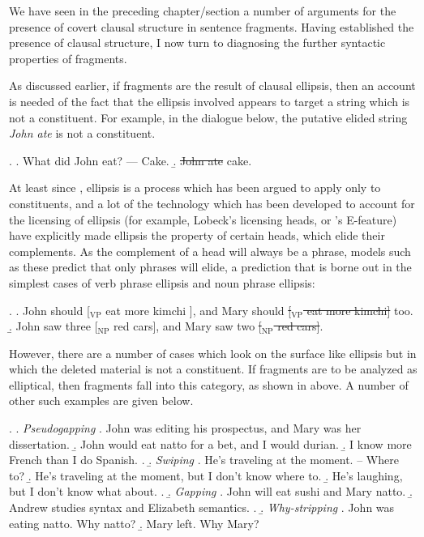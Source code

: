\documentclass[11pt,letterpaper]{article}
\begin{document}
\renewcommand{\firstrefdash}{}

We have seen in the preceding chapter/section %
a number of arguments for the presence of covert clausal structure in sentence fragments. Having established the presence of clausal structure, I now turn to diagnosing the further syntactic properties of fragments.

As discussed earlier, if fragments are the result of clausal ellipsis, then an account is needed of the fact that the ellipsis involved appears to target a string which is not a constituent. For example, in the dialogue below, the putative elided string {\it John ate} is not a constituent.

\ex. 	\a. What did John eat? --- Cake.
	\b. \sout{John ate} cake.
	
At least since \cite{Lo95}, ellipsis is a process which has been argued to apply only to constituents, and a lot of the technology which has been developed to account for the licensing of ellipsis (for example, Lobeck's licensing heads, or \cite{Me01, Me04}'s E-feature) have explicitly made ellipsis the property of certain heads, which elide their complements. As the complement of a head will always be a phrase, models such as these predict that only phrases will elide, a prediction that is borne out in the simplest cases of verb phrase ellipsis and noun phrase ellipsis:

\ex. 	\a. John should [$_{\mathrm{VP}}$ eat more kimchi ], and Mary should \sout{[$_{\mathrm{VP}}$ eat more kimchi]} too.
	\b. John saw three [$_{\mathrm{NP}}$ red cars], and Mary saw two \sout{[$_{\mathrm{NP}}$ red cars]}.
	
However, there are a number of cases which look on the surface like ellipsis but in which the deleted material is not a constituent. If fragments are to be analyzed as elliptical, then fragments fall into this category, as shown in \LLast above. A number of other such examples are given below.

\ex.		\a. 	{\it Pseudogapping}
			\a. John was editing his prospectus, and Mary was her dissertation. 
			\b. John would eat natto for a bet, and I would durian. 
			\b. I know more French than I do Spanish. 
			\z. 
		\b.	{\it Swiping}
			\a.	He's traveling at the moment. -- Where to?
			\b. He's traveling at the moment, but I don't know where to.
			\b.	He's laughing, but I don't know what about.
			\z.
		\b.	{\it Gapping}
			\a. John will eat sushi and Mary natto.
			\b. Andrew studies syntax and Elizabeth semantics.
			\z.
		\b. 	{\it Why-stripping}
			\a. John was eating natto. Why natto?
			\b. Mary left. Why Mary?
\end{document}
